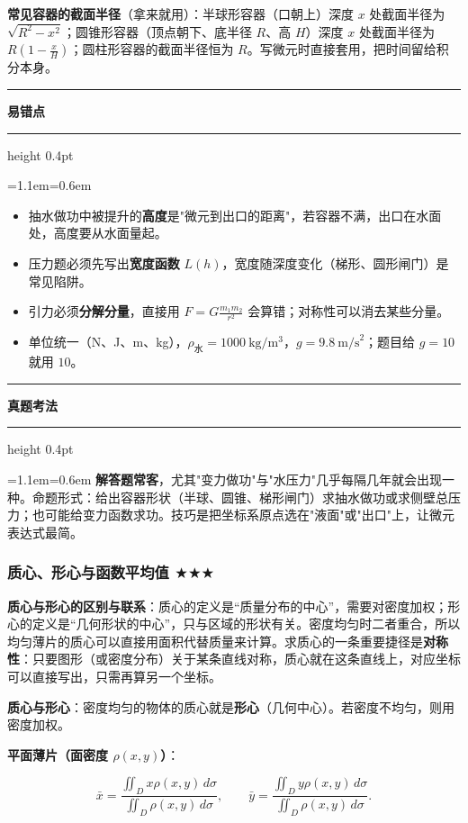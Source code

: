 \documentclass[11pt,openany,UTF8]{ctexbook}
\newcommand{\callouthead}[2]{%
  \par\addvspace{7pt}\noindent
  {\color{#1}\rule[-0.15em]{3pt}{1.05em}}\hspace{0.5em}%
  {\bfseries\color{#1}#2}\par\nobreak\vspace{-0.35em}%
  {\color{rulesep}\hrule height 0.4pt}\nobreak\vspace{0.45em}%
  \begingroup\small\setlength{\parindent}{0pt}%
  \leftskip=1.1em\rightskip=0.6em\noindent\ignorespaces}
\newcommand{\calloutend}{\par\endgroup\addvspace{7pt}}
\newenvironment{callwarn}[1]{\callouthead{warnbar}{#1}}{\calloutend}
\newenvironment{callexam}[1]{\callouthead{exambar}{#1}}{\calloutend}
\begin{document}
\textbf{常见容器的截面半径}（拿来就用）：半球形容器（口朝上）深度 $x$ 处截面半径为 $\sqrt{R^2-x^2}$；圆锥形容器（顶点朝下、底半径 $R$、高 $H$）深度 $x$ 处截面半径为 $R\left(1-\frac{x}{H}\right)$；圆柱形容器的截面半径恒为 $R$。写微元时直接套用，把时间留给积分本身。

\begin{callwarn}{易错点}
\begin{itemize}
\item 抽水做功中被提升的\textbf{高度}是"微元到出口的距离"，若容器不满，出口在水面处，高度要从水面量起。
\item 压力题必须先写出\textbf{宽度函数} $L(h)$，宽度随深度变化（梯形、圆形闸门）是常见陷阱。
\item 引力必须\textbf{分解分量}，直接用 $F=G\frac{m_1m_2}{r^2}$ 会算错；对称性可以消去某些分量。
\item 单位统一（N、J、m、kg），$\rho_{\text{水}}=1000\ \text{kg}/\text{m}^3$，$g=9.8\ \text{m/s}^2$；题目给 $g=10$ 就用 $10$。
\end{itemize}
\end{callwarn}

\begin{callexam}{真题考法}
\textbf{解答题常客}，尤其"变力做功"与"水压力"几乎每隔几年就会出现一种。命题形式：给出容器形状（半球、圆锥、梯形闸门）求抽水做功或求侧壁总压力；也可能给变力函数求功。技巧是把坐标系原点选在"液面"或"出口"上，让微元表达式最简。

\end{callexam}

\subsubsection{质心、形心与函数平均值 $\bigstar$$\bigstar$$\bigstar$}

\textbf{质心与形心的区别与联系}：质心的定义是“质量分布的中心”，需要对密度加权；形心的定义是“几何形状的中心”，只与区域的形状有关。密度均匀时二者重合，所以均匀薄片的质心可以直接用面积代替质量来计算。求质心的一条重要捷径是\textbf{对称性}：只要图形（或密度分布）关于某条直线对称，质心就在这条直线上，对应坐标可以直接写出，只需再算另一个坐标。

\textbf{质心与形心}：密度均匀的物体的质心就是\textbf{形心}（几何中心）。若密度不均匀，则用密度加权。

\textbf{平面薄片（面密度 $\rho(x,y)$）}：

\[\bar{x}=\frac{\displaystyle\iint_Dx\rho(x,y)\,d\sigma}{\displaystyle\iint_D\rho(x,y)\,d\sigma},\qquad \bar{y}=\frac{\displaystyle\iint_Dy\rho(x,y)\,d\sigma}{\displaystyle\iint_D\rho(x,y)\,d\sigma}.\]
\end{document}
